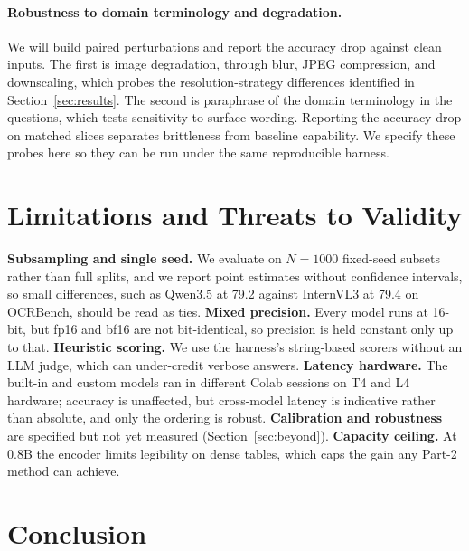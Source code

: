 \documentclass{article}
\begin{document}
\paragraph{Robustness to domain terminology and degradation.}
We will build paired perturbations and report the accuracy drop against clean
inputs. The first is image degradation, through blur, JPEG compression, and
downscaling, which probes the resolution-strategy differences identified in
Section~\ref{sec:results}. The second is paraphrase of the domain terminology in
the questions, which tests sensitivity to surface wording. Reporting the accuracy
drop on matched slices separates brittleness from baseline capability. We specify
these probes here so they can be run under the same reproducible harness.

\section{Limitations and Threats to Validity}
\label{sec:limitations}

\textbf{Subsampling and single seed.} We evaluate on $N{=}1000$ fixed-seed
subsets rather than full splits, and we report point estimates without confidence
intervals, so small differences, such as Qwen3.5 at 79.2 against InternVL3 at
79.4 on OCRBench, should be read as ties. \textbf{Mixed precision.} Every model
runs at 16-bit, but fp16 and bf16 are not bit-identical, so precision is held
constant only up to that. \textbf{Heuristic scoring.} We use the harness's
string-based scorers without an LLM judge, which can under-credit verbose
answers. \textbf{Latency hardware.} The built-in and custom models ran in
different Colab sessions on T4 and L4 hardware; accuracy is unaffected, but
cross-model latency is indicative rather than absolute, and only the ordering is
robust. \textbf{Calibration and robustness} are specified but not yet measured
(Section~\ref{sec:beyond}). \textbf{Capacity ceiling.} At 0.8B the encoder limits
legibility on dense tables, which caps the gain any Part-2 method can achieve.

\section{Conclusion}
\label{sec:conclusion}
\end{document}
